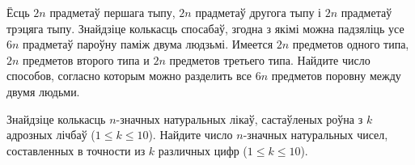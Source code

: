 \begin{problemList}
\bigskip

\problemItemSimple
{Ёсць $2n$ прадметаў першага тыпу, $2n$ прадметаў другога тыпу і $2n$ прадметаў трэцяга тыпу.
Знайдзіце колькасць спосабаў, згодна з якімі можна падзяліць усе $6n$ прадметаў пароўну паміж
двума людзьмі.}
{Имеется $2n$ предметов одного типа, $2n$ предметов второго типа и $2n$ предметов
третьего типа. Найдите число способов, согласно которым можно разделить все $6n$
предметов поровну между двумя людьми.}

\bigskip

\problemItemSimple
{Знайдзіце колькасць $n$-значных натуральных лікаў, састаўленых роўна з $k$
адрозных лічбаў ($1 \le k \le 10$).}
{Найдите число $n$-значных натуральных чисел, составленных в точности из
$k$ различных цифр ($1 \le k \le 10$).}

\end{problemList}


